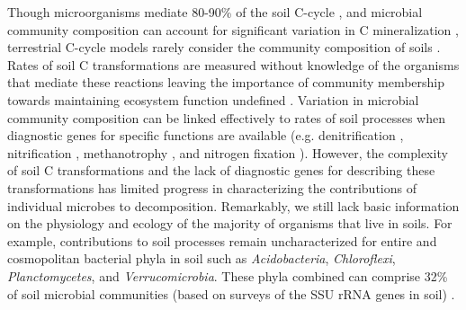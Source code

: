 Though microorganisms mediate 80-90\% of the soil C-cycle
\citep{ColemanCrossley_1996,Nannipieri_2003}, and microbial community
composition can account for significant variation in C mineralization
\citep{Strickland_2009} , terrestrial C-cycle models rarely consider the
community composition of soils \citep{Zak2006,Reed2007}. Rates of soil
C transformations are measured without knowledge of the organisms that mediate
these reactions \citep{Nannipieri_2003} leaving the importance of community
membership towards maintaining ecosystem function undefined
\citep{Nannipieri_2003,Schimel_2012,Allison_2008}. Variation in microbial
community composition can be linked effectively to rates of soil processes when
diagnostic genes for specific functions are available (e.g. denitrification
\citep{Cavigelli2000}, nitrification \citep{Carney2004,Hawkes2005,Webster2005},
methanotrophy \citep{Gulledge1997}, and nitrogen fixation \citep{Hsu2009}).
However, the complexity of soil C transformations and the lack of diagnostic
genes for describing these transformations has limited progress in
characterizing the contributions of individual microbes to decomposition.
Remarkably, we still lack basic information on the physiology and ecology of
the majority of organisms that live in soils. For example, contributions to
soil processes remain uncharacterized for entire and cosmopolitan bacterial
phyla in soil such as \textit{Acidobacteria}, \textit{Chloroflexi},
\textit{Planctomycetes}, and \textit{Verrucomicrobia}. These phyla combined can
comprise 32\% of soil microbial communities (based on surveys of the SSU rRNA
genes in soil) \citep{Janssen2006,Buckley2002}. 

